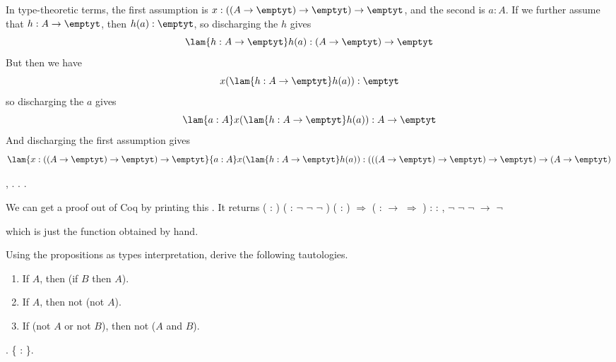 In type-theoretic terms, the first assumption is $x : ((A \to \emptyt) \to
\emptyt) \to \emptyt$, and the second is $a : A$.  If we further assume that
$h : A \to \emptyt$, then $h(a) : \emptyt$, so discharging the $h$ gives
\[
\lam{h:A \to \emptyt}h(a) : (A \to \emptyt) \to \emptyt
\]
But then we have
\[
x(\lam{h : A \to \emptyt}h(a)) : \emptyt
\]
so discharging the $a$ gives
\[
\lam{a:A}x(\lam{h : A \to \emptyt}h(a)) : A \to \emptyt
\]
And discharging the first assumption gives
\[
\lam{x:((A\to\emptyt)\to\emptyt)\to\emptyt}{a:A}x(\lam{h : A \to
\emptyt}h(a)) :
(((A \to \emptyt) \to \emptyt) \to \emptyt) \to (A \to \emptyt)
\] \begin{coqdoccode}
\coqdocemptyline
\coqdocnoindent
{} \coqdockw{\ensuremath{\forall}} , \coqdocnotation{\ensuremath{\lnot}} \coqdocnotation{\ensuremath{\lnot}} \coqdocnotation{\ensuremath{\lnot}}   \coqdocnotation{\ensuremath{\lnot}}. . .\coqdoceol
\coqdocemptyline
\end{coqdoccode}


\noindent 
We can get a proof out of Coq by printing this .  It returns
    \coqdoceol
\coqdocemptyline
\coqdocindent{2.00em}
 ( : ) ( : \ensuremath{\lnot} \ensuremath{\lnot} \ensuremath{\lnot} ) ( : ) \ensuremath{\Rightarrow}  (  :  \ensuremath{\rightarrow}  \ensuremath{\Rightarrow}  ) \coqdoceol
\coqdocindent{2.00em}
: \coqdockw{\ensuremath{\forall}}  : , \ensuremath{\lnot} \ensuremath{\lnot} \ensuremath{\lnot}  \ensuremath{\rightarrow} \ensuremath{\lnot} 

\coqdocemptyline
    \noindent
    which is just the function obtained by hand. 

    Using the propositions as types interpretation, derive the
    following tautologies.
\begin{enumerate}
\item If $A$, then (if $B$ then $A$).
\item If $A$, then not (not $A$).
\item If (not $A$ or not $B$), then not ($A$ and $B$).
\end{enumerate} \begin{coqdoccode}
\coqdocemptyline
\coqdocnoindent
{} .\coqdoceol
\coqdocindent{1.00em}
 \{  : \}.\coqdoceol
\coqdocemptyline
\end{coqdoccode}



